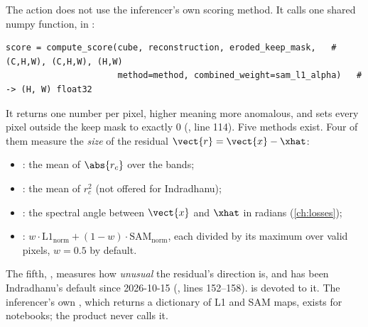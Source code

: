 The action does not use the inferencer's own scoring method. It calls one shared numpy function,
 in :
\begin{lstlisting}
score = compute_score(cube, reconstruction, eroded_keep_mask,   # (C,H,W), (C,H,W), (H,W)
                      method=method, combined_weight=sam_l1_alpha)   # -> (H, W) float32
\end{lstlisting}
It returns one number per pixel, higher meaning more anomalous, and sets every pixel outside the keep mask to
exactly $0$ (, line 114). Five methods exist. Four of them measure the \emph{size} of the
residual $\vect{r}=\vect{x}-\xhat$:
\begin{itemize}
\item {}: the mean of $\abs{r_c}$ over the bands;
\item {}: the mean of $r_c^2$ (not offered for Indradhanu);
\item {}: the spectral angle between $\vect{x}$ and $\xhat$ in radians (\cref{ch:losses});
\item {}: $w\cdot\text{L1}_{\text{norm}}+(1-w)\cdot\text{SAM}_{\text{norm}}$, each divided by its
  maximum over valid pixels, $w=0.5$ by default.
\end{itemize}
The fifth, , measures how \emph{unusual} the residual's direction is, and has
been Indradhanu's default since 2026-10-15 (, lines 152--158).  is
devoted to it. The inferencer's own , which returns a dictionary of L1 and SAM
maps, exists for notebooks; the product never calls it.



